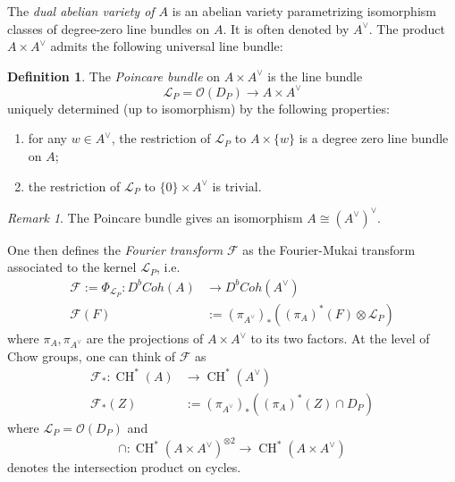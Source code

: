 \documentclass[10pt]{amsart}
\theoremstyle{definition}
\newtheorem{defn}[thm]{Definition}
\theoremstyle{remark}
\newtheorem{rmk}[thm]{Remark}
\DeclareMathOperator{\CH}{CH}
\newcommand{\mcal}{\mathcal}
\def\x{\times}
\begin{document}
The \emph{dual abelian variety of $A$} is an abelian variety parametrizing isomorphism classes of degree-zero line bundles on $A$.
It is often denoted by $A^\vee$.
The product $A \x A^\vee$ admits the following universal line bundle:
\begin{defn}\label{defn:poincarebundle}
    The \emph{Poincare bundle} on $A \x A^\vee$ is the line bundle 
    $$
    \mcal L_P = \mcal O(D_P) \to A \x A^\vee
    $$
    uniquely determined (up to isomorphism) by the following properties:
    \begin{enumerate}
        \item for any $w \in A^\vee$, the restriction of $\mcal L_P$ to $A \x \{w\}$ is a degree zero line bundle on $A$;
        \item the restriction of $\mcal L_P$ to $\{0\} \x A^\vee$ is trivial.
    \end{enumerate} 
\end{defn}
\begin{rmk}\label{rmk:Aveevee}
    The Poincare bundle gives an isomorphism $A \cong (A^\vee)^\vee$.
\end{rmk}

One then defines the \emph{Fourier transform} $\mcal F$ as the Fourier-Mukai transform associated to the kernel $\mcal L_P$, i.e.
\begin{align}\label{eq:algebraic_fourier}
    \mcal F := \Phi_{\mcal L_P}: D^bCoh(A) & \to D^bCoh(A^\vee)\\
    \mcal F(F) &:= (\pi_{A^\vee})_*((\pi_A)^*(F) \otimes \mcal L_P)
\end{align}
where $\pi_A,\pi_{A^\vee}$ are the projections of $A \x A^\vee$ to its two factors.
At the level of Chow groups, one can think of $\mcal F$ as 
\begin{align*}
    \mcal F_*: \CH^*(A) & \to \CH^*(A^\vee)\\
    \mcal F_*(Z) &:= (\pi_{A^\vee})_*((\pi_A)^*(Z) \cap D_P)
\end{align*}
where $\mcal L_P = \mcal O(D_P)$ and 
$$
\cap:\CH^*(A\x A^\vee)^{\otimes 2} \to \CH^*(A\x A^\vee)
$$
denotes the intersection product on cycles.
\end{document}
